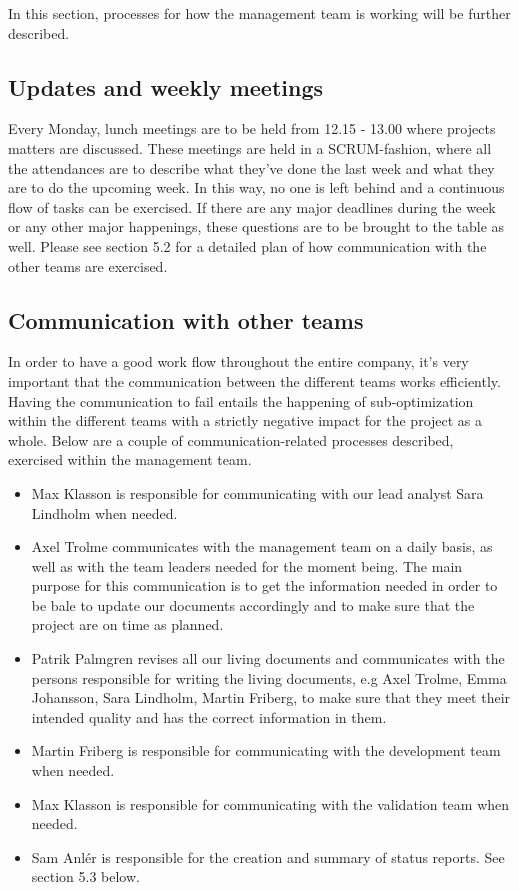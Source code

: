 In this section, processes for how the management team is working will be further described. 

\subsection{Updates and weekly meetings}
Every Monday, lunch meetings are to be held from 12.15 - 13.00 where projects matters are discussed. These meetings are held in a SCRUM-fashion, where all the attendances are to describe what they've done the last week and what they are to do the upcoming week. In this way, no one is left behind and a continuous flow of tasks can be exercised. If there are any major deadlines during the week or any other major happenings, these questions are to be brought to the table as well. Please see section 5.2 for a detailed plan of how communication with the other teams are exercised. 

\subsection{Communication with other teams}
In order to have a good work flow throughout the entire company, it's very important that the communication between the different teams works efficiently. Having the communication to fail entails the happening of sub-optimization within the different teams with a strictly negative impact for the project as a whole. Below are a couple of communication-related processes described, exercised within the management team. 

\begin{itemize}
    \item Max Klasson is responsible for communicating with our lead analyst Sara Lindholm when needed.
    \item Axel Trolme communicates with the management team on a daily basis, as well as with the team leaders needed for the moment being. The main purpose for this communication is to get the information needed in order to be bale to update our documents accordingly and to make sure that the project are on time as planned. 
    \item Patrik Palmgren revises all our living documents and communicates with the persons responsible for writing the living documents, e.g Axel Trolme, Emma Johansson, Sara Lindholm, Martin Friberg, to make sure that they meet their intended quality and has the correct information in them.
    \item Martin Friberg is responsible for communicating with the development team when needed. 
    \item Max Klasson is responsible for communicating with the validation team when needed. 
    \item Sam Anlér is responsible for the creation and summary of status reports. See section 5.3 below.

\end{itemize}

